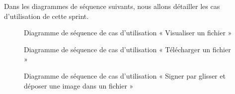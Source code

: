 Dans les diagrammes de séquence suivants, nous allons détailler les cas d'utilisation de cette sprint.\\
\begin{figure}[H]
  \centering
  \caption{Diagramme de séquence de cas d'utilisation « Visualiser un fichier   »}
  \label{fig:sequence_view_file}
\end{figure}

\begin{figure}[H]
  \centering
  \caption{Diagramme de séquence de cas d'utilisation « Télécharger un fichier   »}
  \label{fig:sequence_download_file}
\end{figure}
\begin{figure}[H]
  \centering
  \caption{Diagramme de séquence de cas d'utilisation « Signer par glisser et déposer une image dans un fichier   »}
  \label{fig:sequence_sign_by_image}
\end{figure}

